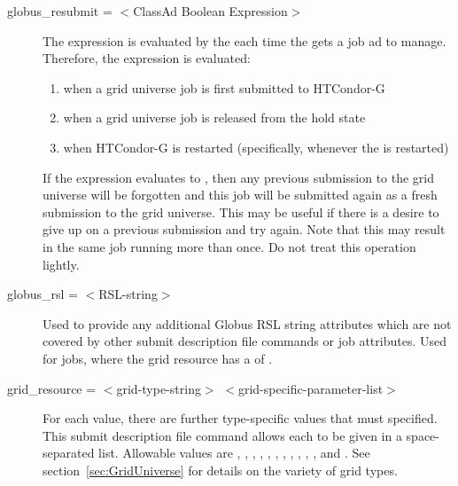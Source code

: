 \begin{description}

\label{condor-submit-globus-resubmit}
\item[globus\_resubmit = $<$ClassAd Boolean Expression$>$]
The expression is evaluated by the  each time
the  gets a job ad to manage.
Therefore, the expression is evaluated:
\begin{enumerate}
\item
   when a grid universe job is first submitted to HTCondor-G
\item
   when a grid universe job is released from the hold state
\item
   when HTCondor-G is restarted (specifically, whenever the 
   is restarted)
\end{enumerate}
If the expression evaluates to ,
then any previous submission to the grid universe will be
forgotten and this job will be submitted again as a fresh submission to
the grid universe.
This may be useful if there is a desire to give up on a
previous submission and try again.
Note that this may result in the same job running more than
once.  Do not treat this operation lightly.


\label{condor-submit-globus-rsl}
\item[globus\_rsl = $<$RSL-string$>$]
Used to provide any additional Globus RSL
string attributes which are not covered by other submit description
file commands or job attributes. Used for  
jobs, where the grid resource has a  of
.

\label{condor-submit-grid-resource}
\item[grid\_resource = $<$grid-type-string$>$ $<$grid-specific-parameter-list$>$ ]
For each  value, 
there are further type-specific values that must specified.
This submit description file command allows each to
be given in a space-separated list.
Allowable  values are
, 
, , 
, 
,
, ,
, , ,
,
and .
See section~\ref{sec:GridUniverse} for details on the variety of 
grid types.


\end{description}

